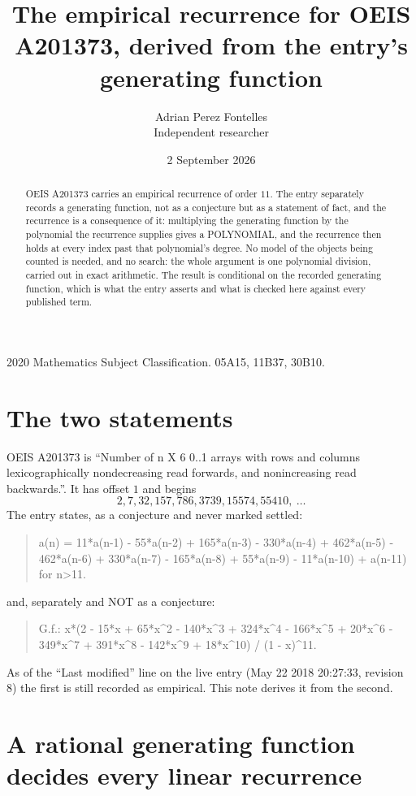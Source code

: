 \documentclass[11pt,a4paper]{article}
\title{The empirical recurrence for OEIS A201373, derived from the entry's generating function}
\author{Adrian Perez Fontelles\\ \small Independent researcher}
\date{2 September 2026}
\theoremstyle{plain}
\theoremstyle{definition}
\begin{document}
\maketitle

\begin{abstract}
OEIS A201373 carries an empirical recurrence of order $11$. The entry separately records a
generating function, not as a conjecture but as a statement of fact, and the recurrence is a
consequence of it: multiplying the generating function by the polynomial the recurrence
supplies gives a POLYNOMIAL, and the recurrence then holds at every index past that
polynomial's degree. No model of the objects being counted is needed, and no search: the
whole argument is one polynomial division, carried out in exact arithmetic. The result is
conditional on the recorded generating function, which is what the entry asserts and what is
checked here against every published term.
\end{abstract}

\noindent\small 2020 Mathematics Subject Classification. 05A15, 11B37, 30B10.\normalsize

\section{The two statements}

OEIS A201373 is ``Number of n X 6 0..1 arrays with rows and columns lexicographically nondecreasing read forwards, and nonincreasing read backwards.''. It has offset $1$ and begins
\[
2, 7, 32, 157, 786, 3739, 15574, 55410,\ \dots
\]
The entry states, as a conjecture and never marked settled:
\begin{quote}
a(n) = 11*a(n-1) - 55*a(n-2) + 165*a(n-3) - 330*a(n-4) + 462*a(n-5) - 462*a(n-6) + 330*a(n-7) - 165*a(n-8) + 55*a(n-9) - 11*a(n-10) + a(n-11) for n>11.
\end{quote}
and, separately and NOT as a conjecture:
\begin{quote}
G.f.: x*(2 - 15*x + 65*x\^{}2 - 140*x\^{}3 + 324*x\^{}4 - 166*x\^{}5 + 20*x\^{}6 - 349*x\^{}7 + 391*x\^{}8 - 142*x\^{}9 + 18*x\^{}10) / (1 - x)\^{}11.
\end{quote}
As of the ``Last modified'' line on the live entry (May 22 2018 20:27:33, revision 8) the first is still
recorded as empirical. This note derives it from the second.

\section{A rational generating function decides every linear recurrence}
\end{document}
